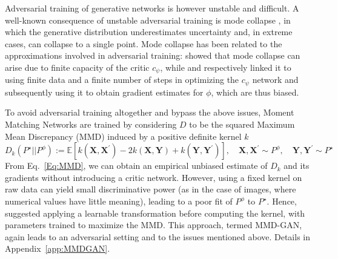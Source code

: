 \documentclass[twoside,11pt]{article}
\newcommand{\E}{\mathbb{E}}
\newcommand{\Ddsim}{\mathbf{X}}
\newcommand{\Ddobs}{\mathbf{Y}}
\begin{document}
	
	Adversarial training of generative networks is however unstable and difficult.
	A well-known consequence of unstable adversarial training is mode collapse \citep{goodfellow2016nips,isola2017image, arora2017generalization,bellemare2017cramer, arora2017gans,richardson2018gans}, in which the generative distribution underestimates uncertainty and, in extreme cases, can collapse to a single point.
	Mode collapse has been related to the approximations involved in adversarial training: \cite{arora2017generalization} showed that mode collapse can arise due to finite capacity of the critic $ c_\psi $, while \cite{bellemare2017cramer} and \cite{binkowski2018demystifying} respectively linked it to using finite data and a finite number of steps in optimizing the $ c_\psi  $ network and subsequently using it to obtain gradient estimates for $ \phi $, which are thus biased.
	
	To avoid adversarial training altogether and bypass the above issues, Moment Matching Networks \citep{li2015generative, dziugaite2015training} are trained by considering $ D $ to be 
	the squared Maximum Mean Discrepancy (MMD) induced by a positive definite kernel $ k $
	\begin{equation}\label{Eq:MMD}
	D_k \left({P}^{\star}|| {P}^{\phi}\right)
	:= \E\left[k\left(\Ddsim, \Ddsim^{\prime}\right)-2 k(\Ddsim, \Ddobs)+k\left(\Ddobs, \Ddobs^{\prime}\right)\right], \quad  \Ddsim, \Ddsim^{\prime}\sim  P^\phi, \quad \Ddobs, \Ddobs^{\prime}\sim P^\star
	\end{equation}
	From Eq.~\eqref{Eq:MMD}, we can obtain an empirical unbiased estimate of $ D_k $ and its gradients without introducing a critic network. 
	However, using a fixed kernel on raw data can yield small discriminative power (as in the case of images, where numerical values have little meaning), leading to a poor fit of $ P^\phi $ to $P^\star$. Hence, \citet{li2017mmd} suggested applying a learnable transformation before computing the kernel, with parameters trained to maximize the MMD. This approach, termed MMD-GAN, again leads to an adversarial setting and to the issues mentioned above. Details in Appendix~\ref{app:MMDGAN}. 
	
	
	
\end{document}
